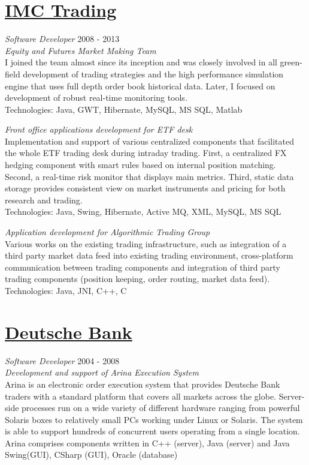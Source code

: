 \documentclass[margin, 10pt]{res}
\begin{document}
\begin{resume}
\section{\href{http://imc.nl}{IMC Trading}}
{\sl Software Developer} \hfill 2008 - 2013 \\
{\sl Equity and Futures Market Making Team} \\
I joined the team almost since its inception and was closely involved in all green-field development of trading strategies and the high performance simulation engine that uses full depth order book historical data. Later, I focused on development of robust real-time monitoring tools. \\  
Technologies: Java, GWT, Hibernate, MySQL, MS SQL, Matlab  

{\sl Front office applications development for ETF desk  } \\
Implementation and support of various centralized components that facilitated the whole ETF trading desk during intraday trading. First, a centralized FX hedging component with smart rules based on internal position matching. Second, a real-time risk monitor that displays main metrics. Third, static data storage provides consistent view on market instruments and pricing for both research and trading.  \\
Technologies: Java, Swing, Hibernate, Active MQ, XML, MySQL, MS SQL  

{\sl Application development for Algorithmic Trading Group }\\
Various works on the existing trading infrastructure, such as integration of a third party market data feed into existing trading environment, cross-platform communication between trading components and integration of third party trading components (position keeping, order routing, market data feed).\\
Technologies: Java, JNI, C++, C

\section{\href{http://db.com}{Deutsche Bank}}
{\sl Software Developer} \hfill 2004 - 2008 \\
{\sl Development and support of Arina Execution System } \\
Arina is an electronic order execution system that provides Deutsche Bank traders with a standard platform that covers all markets across the globe. Server-side processes run on a  wide variety of different hardware ranging from powerful Solaris boxes to relatively small PCs working under Linux or Solaris. The system is able to support hundreds of concurrent users operating from a single location. Arina comprises components written in C++ (server), Java (server) and Java Swing(GUI), CSharp (GUI), Oracle (database)


\end{resume}
\end{document}
